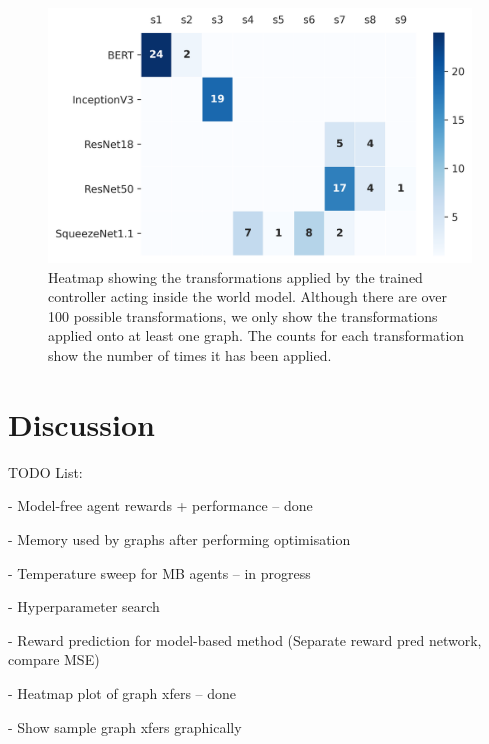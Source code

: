 \begin{figure}[ht]
  \centering
  \includegraphics[width=1\columnwidth]{sections/5evaluation/images/xfer_heatmap.png}
  \caption[Heatmap of graph transformations applied by the model-based controller]{Heatmap showing the transformations applied by the trained controller acting inside the world model. Although there are over 100 possible transformations, we only show the transformations applied onto at least one graph. The counts for each transformation show the number of times it has been applied.}
  \label{fig:eval:xfer-heatmap}
\end{figure}

\section{Discussion}

TODO List:

- Model-free agent rewards + performance -- done

- Memory used by graphs after performing optimisation

- Temperature sweep for MB agents -- in progress

- Hyperparameter search

- Reward prediction for model-based method (Separate reward pred network, compare MSE)

- Heatmap plot of graph xfers -- done

- Show sample graph xfers graphically
